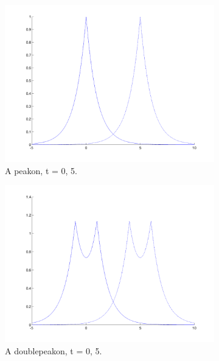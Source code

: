 \begin{figure}[h]
        \centering
        \begin{subfigure}[b]{0.49\textwidth}
                \includegraphics[width=\textwidth]{gfx/peakon}
                \caption{A peakon, t = 0, 5.}
                \label{fig:peakon}
        \end{subfigure}
        \begin{subfigure}[b]{0.49\textwidth}
                \includegraphics[width=\textwidth]{gfx/doublepeakon}
                \caption{A doublepeakon, t = 0, 5.}
                \label{fig:doublepeakon}
        \end{subfigure}
        \begin{subfigure}[b]{0.49\textwidth}

\end{subfigure}
\end{figure}
